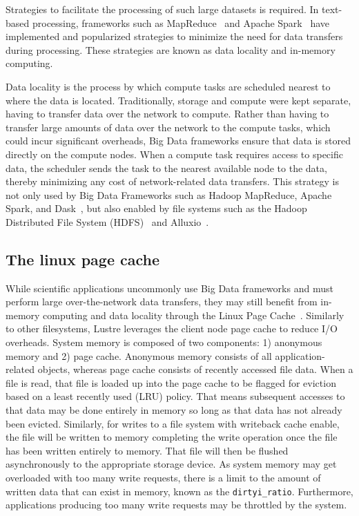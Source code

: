       Strategies to facilitate the processing of such large datasets is required. In text-based
      processing, frameworks such as MapReduce~\cite{mapreduce} and Apache Spark~\cite{spark}
      have implemented and popularized strategies to minimize the need for data transfers during processing.
      These strategies are known as data locality and in-memory computing.

      Data locality is the process by which compute tasks are scheduled nearest to where
      the data is located. Traditionally, storage and compute were kept separate,
      having to transfer data over the network to compute. Rather than having to transfer large amounts of data over the
      network to the compute tasks, which could incur significant overheads, Big Data frameworks ensure that data is
      stored directly on the compute nodes. When a compute task requires access to specific
      data, the scheduler sends the task to the nearest available node to the data, thereby
      minimizing any cost of network-related data transfers. This strategy is not only
      used by Big Data Frameworks such as Hadoop MapReduce, Apache Spark, and Dask~\cite{dask},
      but also enabled by file systems such as the Hadoop Distributed File System (HDFS)~\cite{hdfs}
      and Alluxio~\cite{alluxio}.



\subsection{The linux page cache}
 While scientific applications uncommonly use Big Data frameworks and must perform
      large over-the-network data transfers, they may still benefit from in-memory
      computing and data locality through the Linux Page Cache~\cite{pagecache}. Similarly to other
      filesystems, Lustre leverages the client node page cache to reduce I/O overheads.
      System memory is composed of two components: 1) anonymous memory and 2) page cache.
      Anonymous memory consists of all application-related objects, whereas page cache
      consists of recently accessed file data. When a file is read, that file is loaded
      up into the page cache to be flagged for eviction based on a least recently used (LRU)
      policy. That means subsequent accesses to that data may be done entirely
      in memory so long as that data has not already been evicted. Similarly, for writes
      to a file system with writeback cache enable, the file will be written to memory
      completing the write operation once the file has been written entirely to memory.
      That file will then be flushed asynchronously to the appropriate storage device.
      As system memory may get overloaded with too many write requests, there is a limit to the amount of written data that
      can exist in memory, known as the \texttt{dirtyi\_ratio}. Furthermore, applications
      producing too many write requests may be throttled by the system.
